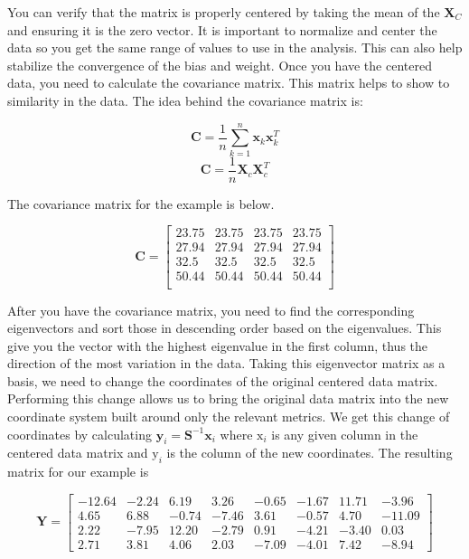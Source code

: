 \documentclass[11pt]{article}
\begin{document}
You can verify that the matrix is properly centered by taking the mean of the $\textbf{X}_{C}$ and ensuring it is the zero vector. It is important to normalize and center the data so you get the same range of values to use in the analysis. This can also help stabilize the convergence of the bias and weight. Once you have the centered data, you need to calculate the covariance matrix. This matrix helps to show to similarity in the data. The idea behind the covariance matrix is:

$$\textbf{C} = \frac{1}{n} \sum_{k=1}^{n} \textbf{x}_{k} \textbf{x}_{k}^{T}$$
$$\textbf{C} = \frac{1}{n} \textbf{X}_c \textbf{X}_{c}^{T}$$

The covariance matrix for the example is below. 

$$
\textbf{C} = 
\begin{bmatrix} 23.75 & 23.75 & 23.75 & 23.75  \\
		27.94 & 27.94 & 27.94 & 27.94  \\	
  	        32.5 & 32.5 & 32.5 & 32.5  \\	
		50.44 & 50.44 & 50.44 & 50.44  \\
\end{bmatrix}
$$

After you have the covariance matrix, you need to find the corresponding eigenvectors and sort those in descending order based on the eigenvalues. This give you the vector with the highest eigenvalue in the first column, thus the direction of the most variation in the data. Taking this eigenvector matrix as a basis, we need to change the coordinates of the original centered data matrix. Performing this change allows us to bring the original data matrix into the new coordinate system built around only the relevant metrics. We get this change of coordinates by calculating $\textbf{y}_{i} = \textbf{S}^{-1} \textbf{x}_{i}$ where $\text{x}_{i}$ is any given column in the centered data matrix and $\text{y}_{i}$ is the column of the new coordinates. The resulting matrix for our example is 

$$
\textbf{Y} = 
\begin{bmatrix} 
-12.64	& -2.24	&6.19	&3.26	&-0.65	&-1.67	&11.71	&-3.96\\
4.65	&6.88	&-0.74	&-7.46	&3.61	&-0.57	&4.70	&-11.09\\
2.22	&-7.95	&12.20	&-2.79	&0.91	&-4.21	&-3.40	&0.03\\
2.71	&3.81	&4.06	&2.03	&-7.09	&-4.01	&7.42	&-8.94
\end{bmatrix}
$$
\end{document}
